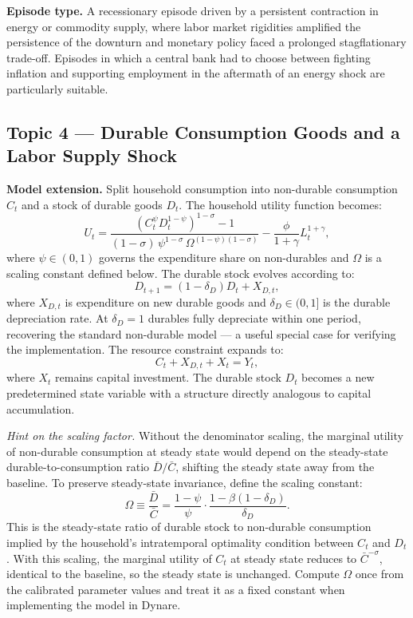 \documentclass[11pt, a4paper]{article}
\begin{document}
\textbf{Episode type.} A recessionary episode driven by a persistent
contraction in energy or commodity supply, where labor market rigidities
amplified the persistence of the downturn and monetary policy faced a prolonged
stagflationary trade-off. Episodes in which a central bank had to choose
between fighting inflation and supporting employment in the aftermath of an
energy shock are particularly suitable.

\subsection{Topic 4 --- Durable Consumption Goods and a Labor Supply Shock}

\textbf{Model extension.} Split household consumption into non-durable
consumption $C_t$ and a stock of durable goods $D_t$. The household utility
function becomes:
\[
    U_t = \frac{(C_t^\psi D_t^{1-\psi})^{1-\sigma}-1}
               {(1-\sigma)\,\psi^{1-\sigma}\,\Omega^{(1-\psi)(1-\sigma)}}
          - \frac{\phi}{1+\gamma}L_t^{1+\gamma},
\]
where $\psi \in (0,1)$ governs the expenditure share on non-durables and
$\Omega$ is a scaling constant defined below. The durable stock evolves
according to:
\[
    D_{t+1} = (1-\delta_D)D_t + X_{D,t},
\]
where $X_{D,t}$ is expenditure on new durable goods and $\delta_D \in (0,1]$
is the durable depreciation rate. At $\delta_D = 1$ durables fully depreciate
within one period, recovering the standard non-durable model --- a useful
special case for verifying the implementation. The resource constraint expands
to:
\[
    C_t + X_{D,t} + X_t = Y_t,
\]
where $X_t$ remains capital investment. The durable stock $D_t$ becomes a new
predetermined state variable with a structure directly analogous to capital
accumulation.

\textit{Hint on the scaling factor.} Without the denominator scaling, the
marginal utility of non-durable consumption at steady state would depend on
the steady-state durable-to-consumption ratio $\bar{D}/\bar{C}$, shifting the
steady state away from the baseline. To preserve steady-state invariance,
define the scaling constant:
\[
    \Omega \equiv \frac{\bar{D}}{\bar{C}}
    = \frac{1-\psi}{\psi}
      \cdot\frac{1-\beta(1-\delta_D)}{\delta_D}.
\]
This is the steady-state ratio of durable stock to non-durable consumption
implied by the household's intratemporal optimality condition between $C_t$ and
$D_t$. With this scaling, the marginal utility of $C_t$ at steady state reduces
to $\bar{C}^{-\sigma}$, identical to the baseline, so the steady state is
unchanged. Compute $\Omega$ once from the calibrated parameter values and treat
it as a fixed constant when implementing the model in Dynare.
\end{document}

